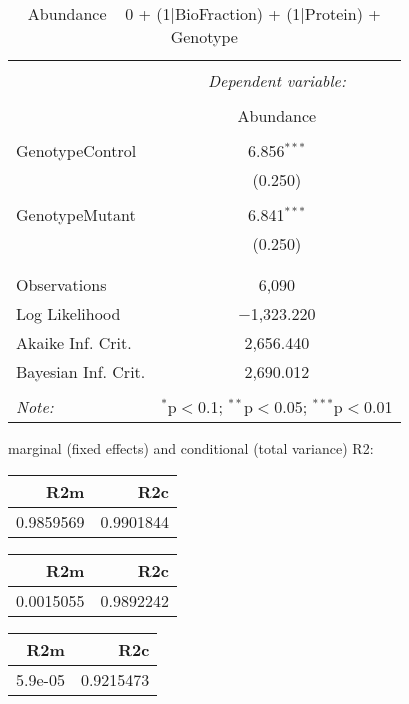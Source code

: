 \documentclass[11pt]{report}
\begin{document}
\begin{table}[!htbp] \centering 
  \caption{Abundance ~ 0 + (1|BioFraction) + (1|Protein) + Genotype} 
  \label{} 
\begin{tabular}{@{\extracolsep{5pt}}lc} 
\\[-1.8ex]\hline 
\hline \\[-1.8ex] 
 & \multicolumn{1}{c}{\textit{Dependent variable:}} \\ 
\cline{2-2} 
\\[-1.8ex] & Abundance \\ 
\hline \\[-1.8ex] 
 GenotypeControl & 6.856$^{***}$ \\ 
  & (0.250) \\ 
  & \\ 
 GenotypeMutant & 6.841$^{***}$ \\ 
  & (0.250) \\ 
  & \\ 
\hline \\[-1.8ex] 
Observations & 6,090 \\ 
Log Likelihood & $-$1,323.220 \\ 
Akaike Inf. Crit. & 2,656.440 \\ 
Bayesian Inf. Crit. & 2,690.012 \\ 
\hline 
\hline \\[-1.8ex] 
\textit{Note:}  & \multicolumn{1}{r}{$^{*}$p$<$0.1; $^{**}$p$<$0.05; $^{***}$p$<$0.01} \\ 
\end{tabular} 
\end{table} 
marginal (fixed effects) and conditional (total variance) R2:

\begin{tabular}{r|r}
\hline
R2m & R2c\\
\hline
0.9859569 & 0.9901844\\
\hline
\end{tabular}

\begin{tabular}{r|r}
\hline
R2m & R2c\\
\hline
0.0015055 & 0.9892242\\
\hline
\end{tabular}

\begin{tabular}{r|r}
\hline
R2m & R2c\\
\hline
5.9e-05 & 0.9215473\\
\hline
\end{tabular}
\end{document}
